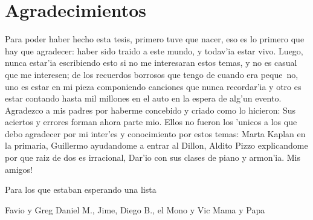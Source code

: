 \section*{Agradecimientos}
Para poder haber hecho esta tesis, primero tuve que nacer, eso es lo primero que hay que agradecer: 
haber sido traido a este mundo, y todav'ia estar vivo. 
Luego, nunca estar'ia escribiendo esto si no me interesaran estos temas, y no es casual que me interesen; 
de los recuerdos borrosos que tengo de cuando era peque~no,
uno es estar en mi pieza componiendo canciones que nunca recordar'ia y otro es estar contando hasta mil millones en 
el auto en la espera de alg'un evento.
Agradezco a mis padres por haberme concebido y criado como lo hicieron: Sus aciertos y errores forman ahora parte mio. 
Ellos no fueron los 'unicos a los que debo agradecer por mi inter'es y conocimiento por estos temas: Marta Kaplan en la 
primaria, Guillermo ayudandome a entrar al Dillon, Aldito Pizzo explicandome por que raiz de dos es irracional, Dar'io
con sus clases de piano y armon'ia.
Mis amigos!



Para los que estaban esperando una lista 

Favio y Greg
Daniel M., Jime, Diego B., el Mono y Vic
Mama y Papa
